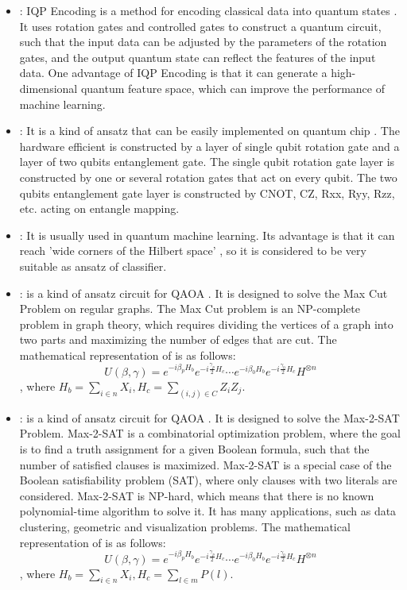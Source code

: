 \begin{itemize}
    \item \IQPEncoding: IQP Encoding is a method for encoding classical data into quantum states \cite{Havlíček2019}. It uses rotation gates and controlled gates to construct a quantum circuit, such that the input data can be adjusted by the parameters of the rotation gates, and the output quantum state can reflect the features of the input data. One advantage of IQP Encoding is that it can generate a high-dimensional quantum feature space, which can improve the performance of machine learning.

    \item \HardwareEfficientAnsatz: It is a kind of ansatz that can be easily implemented on quantum chip \cite{Kandala2017,doi:10.1021/acs.jctc.3c00966}. The hardware efficient is constructed by a layer of single qubit rotation gate and a layer of two qubits entanglement gate. The single qubit rotation gate layer is constructed by one or several rotation gates that act on every qubit. The two qubits entanglement gate layer is constructed by CNOT, CZ, Rxx, Ryy, Rzz, etc. acting on entangle mapping.

    \item \StronglyEntangling: It is usually used in quantum machine learning. Its advantage is that it can reach 'wide corners of the Hilbert space' \cite{Schuld_2020}, so it is considered to be very suitable as ansatz of classifier.

    \item \MaxCutAnsatz: \MaxCutAnsatz is a kind of ansatz circuit for QAOA \cite{farhi2014quantum}. It is designed to solve the Max Cut Problem on regular graphs. The Max Cut problem is an NP-complete problem in graph theory, which requires dividing the vertices of a graph into two parts and maximizing the number of edges that are cut. The mathematical representation of \MaxCutAnsatz is as follows:
          $$U(\beta, \gamma) = e^{-i\beta_pH_b}e^{-i\frac{\gamma_p}{2}H_c}
              \cdots e^{-i\beta_0H_b}e^{-i\frac{\gamma_0}{2}H_c}H^{\otimes n}$$,
          where $H_b = \sum_{i\in n}X_{i}, H_c = \sum_{(i,j)\in C}Z_iZ_j$.

    \item \MaxToSATAnsatz: \MaxToSATAnsatz is a kind of ansatz circuit for QAOA \cite{Akshay_2020}. It is designed to solve the Max-2-SAT Problem. Max-2-SAT is a combinatorial optimization problem, where the goal is to find a truth assignment for a given Boolean formula, such that the number of satisfied clauses is maximized. Max-2-SAT is a special case of the Boolean satisfiability problem (SAT), where only clauses with two literals are considered. Max-2-SAT is NP-hard, which means that there is no known polynomial-time algorithm to solve it. It has many applications, such as data clustering, geometric and visualization problems. The mathematical representation of \MaxToSATAnsatz is as follows:
          $$U(\beta, \gamma) = e^{-i\beta_pH_b}e^{-i\frac{\gamma_p}{2}H_c}
              \cdots e^{-i\beta_0H_b}e^{-i\frac{\gamma_0}{2}H_c}H^{\otimes n}$$,
          where $H_b = \sum_{i\in n}X_{i}, H_c = \sum_{l\in m}P(l)$.


\end{itemize}
